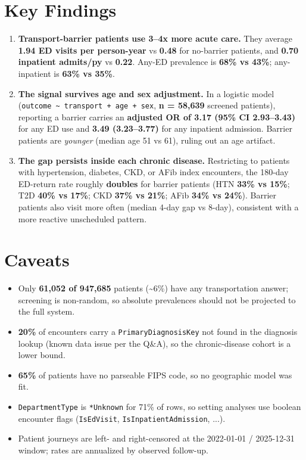 \documentclass[9pt]{article}
\begin{document}
\section*{\textcolor{accent}{Key Findings}}
\begin{enumerate}
  \item \textbf{Transport-barrier patients use 3--4x more acute care.} They average \textbf{1.94 ED visits per person-year} vs \textbf{0.48} for no-barrier patients, and \textbf{0.70 inpatient admits/py} vs \textbf{0.22}. Any-ED prevalence is \textbf{68\% vs 43\%}; any-inpatient is \textbf{63\% vs 35\%}.
  \item \textbf{The signal survives age and sex adjustment.} In a logistic model (\texttt{outcome \textasciitilde{} transport + age + sex}, \textbf{n = 58,639} screened patients), reporting a barrier carries an \textbf{adjusted OR of 3.17 (95\% CI 2.93--3.43)} for any ED use and \textbf{3.49 (3.23--3.77)} for any inpatient admission. Barrier patients are \textit{younger} (median age 51 vs 61), ruling out an age artifact.
  \item \textbf{The gap persists inside each chronic disease.} Restricting to patients with hypertension, diabetes, CKD, or AFib index encounters, the 180-day ED-return rate roughly \textbf{doubles} for barrier patients (HTN \textbf{33\% vs 15\%}; T2D \textbf{40\% vs 17\%}; CKD \textbf{37\% vs 21\%}; AFib \textbf{34\% vs 24\%}). Barrier patients also visit more often (median 4-day gap vs 8-day), consistent with a more reactive unscheduled pattern.
\end{enumerate}

\section*{\textcolor{accent}{Caveats}}
\begin{itemize}
  \item Only \textbf{61,052 of 947,685} patients (\textasciitilde{}6\%) have any transportation answer; screening is non-random, so absolute prevalences should not be projected to the full system.
  \item \textbf{20\%} of encounters carry a \texttt{PrimaryDiagnosisKey} not found in the diagnosis lookup (known data issue per the Q\&A), so the chronic-disease cohort is a lower bound.
  \item \textbf{65\%} of patients have no parseable FIPS code, so no geographic model was fit.
  \item \texttt{DepartmentType} is \texttt{*Unknown} for 71\% of rows, so setting analyses use boolean encounter flags (\texttt{IsEdVisit}, \texttt{IsInpatientAdmission}, ...).
  \item Patient journeys are left- and right-censored at the 2022-01-01 / 2025-12-31 window; rates are annualized by observed follow-up.
\end{itemize}
\end{document}

